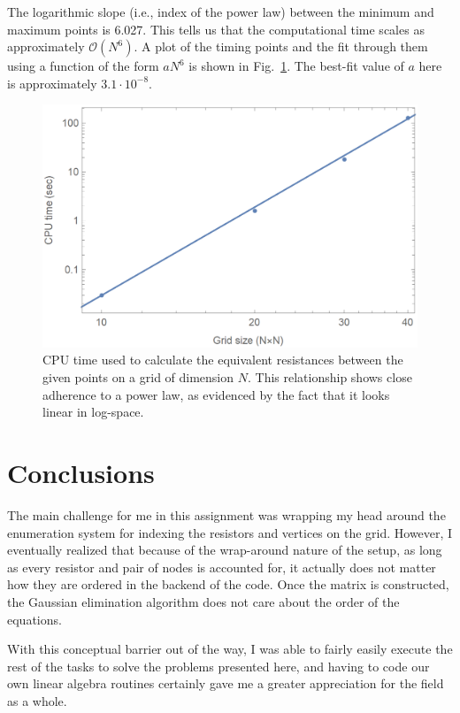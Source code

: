 \documentclass{article}
\begin{document}
The logarithmic slope (i.e., index of the power law) between the minimum and maximum points is 6.027. This tells us that the computational time scales as approximately $\mathcal{O}(N^6)$. A plot of the timing points and the fit through them using a function of the form $aN^6$ is shown in Fig.~\ref{fig:timing}. The best-fit value of $a$ here is approximately $3.1\cdot10^{-8}$.

\begin{figure}[H]
    \centering
    \includegraphics{homework5/time.png}
    \caption{CPU time used to calculate the equivalent resistances between the given points on a grid of dimension $N$. This relationship shows close adherence to a power law, as evidenced by the fact that it looks linear in log-space.}
    \label{fig:timing}
\end{figure}

\section{Conclusions}

The main challenge for me in this assignment was wrapping my head around the enumeration system for indexing the resistors and vertices on the grid. However, I eventually realized that because of the wrap-around nature of the setup, as long as every resistor and pair of nodes is accounted for, it actually does not matter how they are ordered in the backend of the code. Once the matrix is constructed, the Gaussian elimination algorithm does not care about the order of the equations.

With this conceptual barrier out of the way, I was able to fairly easily execute the rest of the tasks to solve the problems presented here, and having to code our own linear algebra routines certainly gave me a greater appreciation for the field as a whole.
\end{document}
